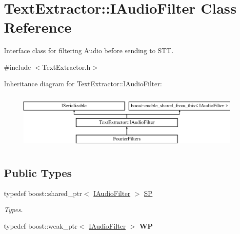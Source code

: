 \hypertarget{class_text_extractor_1_1_i_audio_filter}{}\section{Text\+Extractor\+:\+:I\+Audio\+Filter Class Reference}
\label{class_text_extractor_1_1_i_audio_filter}


Interface class for filtering Audio before sending to S\+TT.  




{\ttfamily \#include $<$Text\+Extractor.\+h$>$}

Inheritance diagram for Text\+Extractor\+:\+:I\+Audio\+Filter\+:\begin{figure}[H]
\begin{center}
\leavevmode
\includegraphics[height=2.926829cm]{class_text_extractor_1_1_i_audio_filter}
\end{center}
\end{figure}
\subsection*{Public Types}
\begin{DoxyCompactItemize}
\item 
\mbox{\label{class_text_extractor_1_1_i_audio_filter_ad0299b138a52b6307bcbd3096a673de5}} 
typedef boost\+::shared\+\_\+ptr$<$ \hyperlink{class_text_extractor_1_1_i_audio_filter}{I\+Audio\+Filter} $>$ \hyperlink{class_text_extractor_1_1_i_audio_filter_ad0299b138a52b6307bcbd3096a673de5}{SP}
\begin{DoxyCompactList}\small\item\em Types. \end{DoxyCompactList}\item 
\mbox{\label{class_text_extractor_1_1_i_audio_filter_a58f973ff58ae0e74495119808160fd31}} 
typedef boost\+::weak\+\_\+ptr$<$ \hyperlink{class_text_extractor_1_1_i_audio_filter}{I\+Audio\+Filter} $>$ {\bfseries WP}
\end{DoxyCompactItemize}
